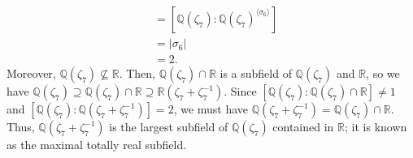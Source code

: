 \documentclass[10pt]{extarticle}
\newcommand{\Q}{\mathbb{Q}}
\newcommand{\R}{\mathbb{R}}
\begin{document}
  \begin{align*}
    [\Q(\zeta_7):\Q(\zeta_7 + \zeta_7^{-1})] &= [\Q(\zeta_7):\Q(\zeta_7)^{\langle \sigma_6\rangle}]\\
                                             &= |\sigma_6|\\
                                             &= 2.
  \end{align*}
  Moreover, $\Q(\zeta_7)\nsubseteq \R$. Then, $\Q(\zeta_7)\cap \R$ is a subfield of $\Q(\zeta_7)$ and $\R$, so we have $\Q(\zeta_7) \supseteq \Q(\zeta_7)\cap \R\supseteq \R(\zeta_7 + \zeta_7^{-1})$. Since $[\Q(\zeta_7):\Q(\zeta_7)\cap \R]\neq 1$ and $[\Q(\zeta_7):\Q(\zeta_7 + \zeta_7^{-1})] = 2$, we must have $\Q(\zeta_7 + \zeta_7^{-1}) = \Q(\zeta_7)\cap \R$.\\
  
  Thus, $\Q(\zeta_7 + \zeta_7^{-1})$ is the largest subfield of $\Q(\zeta_7)$ contained in $\R$; it is known as the maximal totally real subfield.
\end{document}
